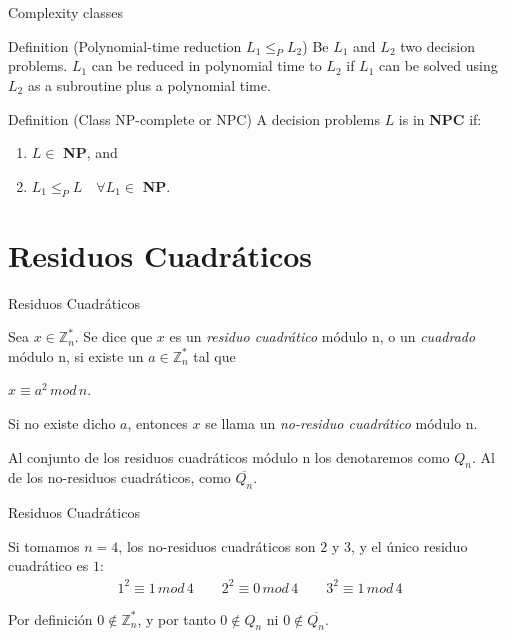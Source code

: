 \documentclass{beamer}
\begin{document}
\begin{frame}{Complexity classes}

\begin{block}{Definition (Polynomial-time reduction $L_1 \leq_P L_2$)}
	Be $L_1$ and $L_2$ two decision problems. $L_1$ can be reduced in polynomial time to $L_2$ if $L_1$ can be solved using $L_2$ as a subroutine plus a polynomial time.
\end{block}

\begin{block}{Definition (Class NP-complete or NPC)}
	A decision problems $L$ is in \textbf{NPC} if:
	\begin{enumerate}
		\item $L \in $ \textbf{NP}, and
		\item $L_1 \leq_P L \quad \forall L_1 \in $ \textbf{NP}.
	\end{enumerate}
\end{block}
\end{frame}


\section{Residuos Cuadráticos}

\begin{frame}{Residuos Cuadráticos}
	\begin{definition}
		Sea $x\in \mathbb{Z}^*_n$. Se dice que $x$ es un \textit{residuo cuadrático}
		módulo n, o un \textit{cuadrado} módulo n, si existe un $a \in \mathbb{Z}^*_n$
		tal que
		
		$x \equiv a^2 \, mod \, n$.
		
		Si no existe dicho $a$, entonces $x$ se llama un \textit{no-residuo cuadrático} módulo n.
	\end{definition}

	Al conjunto de los residuos cuadráticos módulo n los denotaremos como $Q_n$.
	Al de los no-residuos cuadráticos, como $\overline{Q_n}$.
\end{frame}


\begin{frame}{Residuos Cuadráticos}
	\begin{example}
		Si tomamos $n=4$, los no-residuos cuadráticos son $2$ y $3$, y el único residuo cuadrático es $1$:
		\begin{align*}
		1^2 \equiv 1 \, mod \, 4 \qquad 2^2 \equiv 0 \, mod \, 4 \qquad  3^2 \equiv 1 \, mod \, 4
		\end{align*}
	\end{example}
	Por definición $0 \notin \mathbb{Z}^*_n$, y por tanto $0 \notin Q_n$ ni $0 \notin \overline{Q_n}$.
\end{frame}
\end{document}
